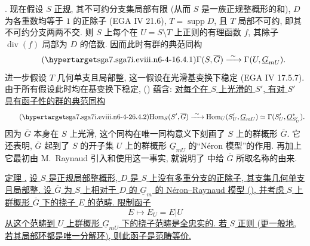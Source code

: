\medskip
\noindent {}. 现在假设 $S$ \underline{正规}, 其不可约分支集局部有限 (从而 $S$ 是一族正规整概形的和), $D$ 为各重数均等于 $1$ 的正除子 (EGA IV 21.6), $T=\operatorname{supp}D$, 且 $T$ 局部不可约, 即其不可约分支两两不交. 则 $S$ 上每个在 $U=S\setminus T$ 上正则的有理函数 $f$, 其除子 $\operatorname{div}(f)$ 局部为 $D$ 的倍数. 因而此时有群的典范同构
\begin{equation}\tag{\SGARefTarget{sga7.sga7i.eviii.n6-4-1}{6.4.1}}
 \Gamma(S,\overline G)\xrightarrow{\ \sim\ }
 \Gamma(U,\underline G_{mU}).
\end{equation}
进一步假设 $T$ 几何单支且局部整, 这一假设在光滑基变换下稳定 (EGA IV 17.5.7). 由于所有假设此时均在基变换下稳定, () 蕴含: \underline{对每个在 $S$ 上光滑的 $S'$, 有对 $S'$ 具有函子性的群的典范同构}
\begin{equation}\tag{\SGARefTarget{sga7.sga7i.eviii.n6-4-2}{6.4.2}}
 \mathrm{Hom}_S(S',\overline G)\xrightarrow{\ \sim\ }
 \mathrm{Hom}_U(S'_U,\underline G_{mU})
 \simeq\Gamma(S'_U,\underline O_{S'_U}^*).
\end{equation}
因为 $\overline G$ 本身在 $S$ 上光滑, 这个同构在唯一同构意义下刻画了 $S$ 上的群概形 $\overline G$. 它还表明, $\overline G$ 起到了 $S$ 的开子集 $U$ 上的群概形 $\underline G_{mU}$ 的“N\'eron 模型”的作用. 再加上它最初由 M.~Raynaud 引入和使用这一事实, 就说明了  中给 $\overline G$ 所取名称的由来.




\medskip
\noindent\underline{定理 .} \underline{设 $S$ 是正规局部整概形, $D$ 是 $S$ 上没有多重分支的正除子, 其支集几何单支且局部整. 设 $\overline G$ 为 $S$ 上相对于 $D$ 的 $\underline G_m$ 的 N\'eron--Raynaud 模型 (), 并考虑 $S$ 上群概形 $\overline G$ 下的挠子 $E$ 的范畴. 限制函子}
\[
 E\longmapsto E_U=E|U
\]
\underline{从这个范畴到 $U$ 上群概形 $\underline G_{mU}$ 下的挠子范畴是全忠实的. 若 $S$ 正则 (更一般地, 若其局部环都是唯一分解环), 则此函子是范畴等价.}

